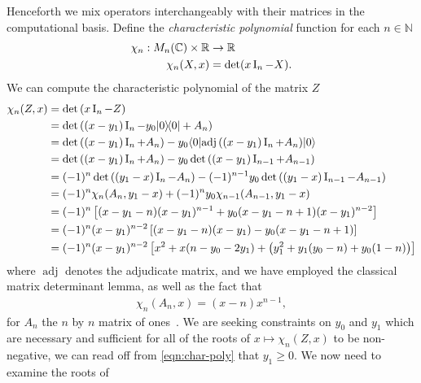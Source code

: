 
Henceforth we mix operators interchangeably with their matrices in the computational basis. Define the \emph{characteristic polynomial} function for each $n\in\mathbb{N}$
\begin{align}
  \chi_n:M_n(\mathbb{C})\times \mathbb{R} &\to \mathbb{R}\\
  \chi_n(X, x) &= \det(x\operatorname{I}_n - X).
\end{align}
We can compute the characteristic polynomial of the matrix $Z$
\begin{align}
  \chi_n(Z,x) &= \det\left(x\operatorname{I}_n -Z\right)\\
              &=\det\left((x-y_1)\operatorname{I}_n - y_0|0\rangle\!\langle0| + A_n\right)\\
              &=\det\left((x-y_1)\operatorname{I}_n + A_n\right) -y_0 \langle 0 |{\operatorname{adj}\left({(x-y_1)\operatorname{I}_n + A_n}\right)} | 0 \rangle\\
              &=\det\left((x-y_1)\operatorname{I}_n + A_n\right) -y_0 \det\left((x-y_1)\operatorname{I}_{n-1} + A_{n-1}\right)\\
              &=(-1)^n \det\left((y_1-x)\operatorname{I}_n - A_n\right) -(-1)^{n-1} y_0 \det\left((y_1-x)\operatorname{I}_{n-1} - A_{n-1}\right)\\
              &=(-1)^n \chi_n(A_n,y_1-x)  + (-1)^{n} y_0 \chi_{n-1}(A_{n-1}, y_1-x)\\
              &= (-1)^n\left[(x-y_1-n)(x-y_1)^{n-1} +y_0(x-y_1-n+1)(x-y_1)^{n-2}\right]\\
              &= (-1)^n(x-y_1)^{n-2}\left[(x-y_1-n)(x-y_1) -y_0(x-y_1-n+1)\right]\\
              &= (-1)^n(x-y_1)^{n-2}\left[x^2 + x(n-y_0 -2y_1) + \left(y_1^2 + y_1(y_0-n) + y_0(1-n)\right)\right]
                \label{eqn:char-poly}
\end{align}
where $\operatorname{adj}$ denotes the adjudicate matrix, and we have employed the classical matrix determinant lemma, as well as the fact that
\begin{align}
  \chi_n(A_n,x) = (x-n)x^{n-1},
\end{align}
for $A_n$ the $n$ by $n$ matrix of ones~\cite{matrix-analysis}.
We are seeking constraints on $y_0$ and $y_1$ which are necessary and sufficient for all of the roots of $x\mapsto \chi_n(Z,x)$ to be non-negative, we can read off from \eqref{eqn:char-poly} that $y_1 \geq 0$. We now need to examine the roots of 
